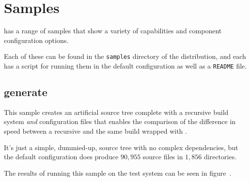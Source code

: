 %
%
%
%
\chapter{Samples}\label{chap:samples}

\lmsbw has a range of samples that show a variety of capabilities and
component configuration options.

Each of these can be found in the \texttt{samples} directory of the
\lmsbw distribution, and each has a script for running them in the
default configuration as well as a \texttt{README} file.


\section{generate}\label{samples:generate}

This sample creates an artificial source tree complete with a
recursive \make build system \emph{and} \lmsbw configuration files
that enables the comparison of the difference in speed between a
recursive \make and the same build wrapped with \lmsbw.

It's just a simple, dummied-up, source tree with no complex
dependencies, but the default configuration does produce $90,955$ source
files in $1,856$ directories.

The results of running this sample on the test system can be seen in
figure~.

